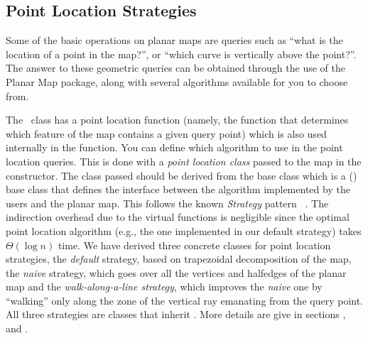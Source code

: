 \subsection{Point Location Strategies}
\label{PM_sec:point_location}
Some of the basic operations on planar maps are queries such as ``what
is the location of a point in the map?'', or ``which curve is
vertically above the point?''. The answer to these geometric queries can
be obtained through the use of the Planar Map package, along with several
algorithms available for you to choose from.

The \ccClassTemplateName\ class has a point location function
(namely, the  function that determines which feature of the map 
contains a given query point)
which is also used internally in the  function.
You can define which algorithm to use in the
point location queries. This is done with a {\em point location class}
passed to the map in the constructor. The class passed should be derived
from the base class  which is a
() base class that defines the interface between the 
algorithm implemented by the users and the planar map. This follows the 
known {\it Strategy}
pattern ~\cite{cgal:ghjv-dpero-95}. The indirection overhead due to the virtual
functions is negligible since the optimal point location algorithm 
(e.g., the one implemented in our default strategy) takes $\Theta(\log n)$ time.
We have derived three concrete classes for point location strategies,
the {\it default\/} strategy, based on trapezoidal decomposition of the map,
the {\it naive\/} strategy, which goes over all the vertices and halfedges
of the planar map and the {\it walk-along-a-line strategy\/}, which improves
the {\it naive\/} one by ``walking'' only along the zone of the vertical ray
emanating from the query point. All three strategies are classes
that inherit .
More details are give in sections 
  , 
   and
  .


